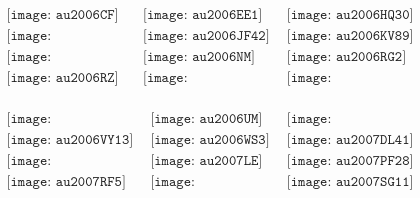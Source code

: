 \documentclass{article}
\begin{document}
        \clearpage
        \begin{figure}[H]
 \begin{center}$
 \begin{array}{cccc}
\texttt{[image: au2006CF]}&\texttt{[image: au2006EE1]}&\texttt{[image: au2006HQ30]}\\\texttt{[image: au2006HR30]}&\texttt{[image: au2006JF42]}&\texttt{[image: au2006KV89]}\\\texttt{[image: au2006MJ10]}&\texttt{[image: au2006NM]}&\texttt{[image: au2006RG2]}\\\texttt{[image: au2006RZ]}&\texttt{[image: au2006SV134]}&\texttt{[image: au2006UC185]}\\
\end{array}$
\end{center}
\end{figure}

\begin{figure}[H]
 \begin{center}$
 \begin{array}{cccc}
\texttt{[image: au2006UL217]}&\texttt{[image: au2006UM]}&\texttt{[image: au2006UN216]}\\\texttt{[image: au2006VY13]}&\texttt{[image: au2006WS3]}&\texttt{[image: au2007DL41]}\\\texttt{[image: au2007DT103]}&\texttt{[image: au2007LE]}&\texttt{[image: au2007PF28]}\\\texttt{[image: au2007RF5]}&\texttt{[image: au2007RU17]}&\texttt{[image: au2007SG11]}\\
\end{array}$
\end{center}
\end{figure}
\end{document}
